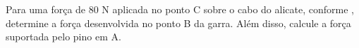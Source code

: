 Para uma força de 80 N aplicada no ponto C sobre o cabo do alicate, conforme \figuraquestao, determine a força desenvolvida no ponto B da garra. Além disso, calcule a força suportada pelo pino em A.
